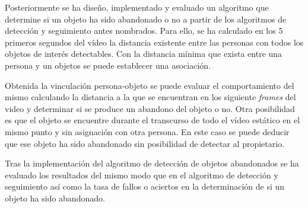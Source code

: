 Posteriormente se ha diseño, implementado y evaluado un algoritmo que determine si un objeto ha sido abandonado o no a partir de los algoritmos de detección y seguimiento antes nombrados. Para ello, se ha calculado en los 5 primeros segundos del vídeo la distancia existente entre las personas con todos los objetos de interés detectables. Con la distancia mínima que exista entre una persona y un objetos se puede establecer una asociación.

Obtenida la vinculación persona-objeto se puede evaluar el comportamiento del mismo calculando la distancia a la que se encuentran en los siguiente \textit{frames} del video y determinar si se produce un abandono del objeto o no. Otra posibilidad es que el objeto se encuentre durante el transcurso de todo el vídeo estático \cite{article} en el mismo punto y sin asignación con otra persona. En este caso se puede deducir que ese objeto ha sido abandonado sin posibilidad de detectar al propietario.

Tras la implementación del algoritmo de detección de objetos abandonados se ha evaluado los resultados del mismo modo que en el algoritmo de detección y seguimiento así como la tasa de fallos o aciertos en la determinación de si un objeto ha sido abandonado.
